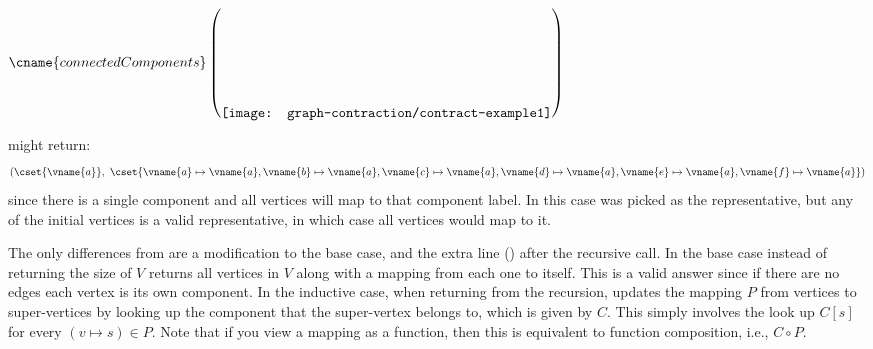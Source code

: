 {\begin{example}~
\label{ex:concomp}
\vspace{-.2in}
\begin{center}
$\cname{connectedComponents}\left(\raisebox{-.5in}{\texttt{[image: graph-contraction/contract-example1]}}\right)$
\end{center}
might return:
\begin{eqnarray*}
(\cset{\vname{a}}, ~\cset{\vname{a} \mapsto \vname{a}, 
                          \vname{b} \mapsto \vname{a}, 
                          \vname{c} \mapsto \vname{a}, 
                          \vname{d} \mapsto \vname{a}, 
                          \vname{e} \mapsto \vname{a}, 
                          \vname{f} \mapsto \vname{a}})
\end{eqnarray*}
since there is a single component and all vertices will map to that
component label.  In this case  was picked as the
representative, but any of the initial vertices is a valid
representative, in which case all vertices would map to it.
\end{example}

The only differences from  are a modification
to the base case, and the extra line () after
the recursive call.  In the base case instead of returning the size of
$V$ returns all vertices in $V$ along with a mapping from each one to
itself.  This is a valid answer since if there are no edges each
vertex is its own component.  In the inductive case, when returning
from the recursion,  updates the mapping $P$
from vertices to super-vertices by looking up the component that the
super-vertex belongs to, which is given by $C$.  This simply involves
the look up $C[s]$ for every $(v \mapsto s) \in P$.  Note that if you
view a mapping as a function, then this is equivalent to function
composition, i.e., $C \circ P$.

}
